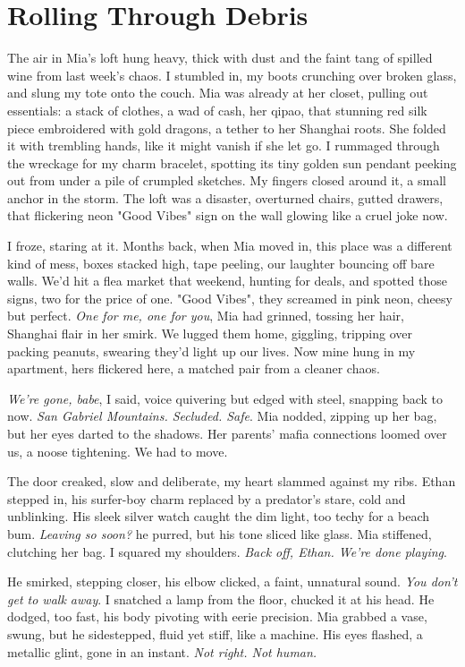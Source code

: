 \documentclass[12pt,oneside]{book}
\begin{document}
\chapter{Rolling Through Debris}

The air in Mia’s loft hung heavy, thick with dust and the faint tang of spilled wine from last week’s chaos. I stumbled in, my boots crunching over broken glass, and slung my tote onto the couch. Mia was already at her closet, pulling out essentials: a stack of clothes, a wad of cash, her qipao, that stunning red silk piece embroidered with gold dragons, a tether to her Shanghai roots. She folded it with trembling hands, like it might vanish if she let go. I rummaged through the wreckage for my charm bracelet, spotting its tiny golden sun pendant peeking out from under a pile of crumpled sketches. My fingers closed around it, a small anchor in the storm. The loft was a disaster, overturned chairs, gutted drawers, that flickering neon "Good Vibes" sign on the wall glowing like a cruel joke now.

I froze, staring at it. Months back, when Mia moved in, this place was a different kind of mess, boxes stacked high, tape peeling, our laughter bouncing off bare walls. We’d hit a flea market that weekend, hunting for deals, and spotted those signs, two for the price of one. "Good Vibes", they screamed in pink neon, cheesy but perfect. \textit{One for me, one for you}, Mia had grinned, tossing her hair, Shanghai flair in her smirk. We lugged them home, giggling, tripping over packing peanuts, swearing they’d light up our lives. Now mine hung in my apartment, hers flickered here, a matched pair from a cleaner chaos.

\textit{We’re gone, babe}, I said, voice quivering but edged with steel, snapping back to now. \textit{San Gabriel Mountains. Secluded. Safe}. Mia nodded, zipping up her bag, but her eyes darted to the shadows. Her parents’ mafia connections loomed over us, a noose tightening. We had to move.

The door creaked, slow and deliberate, my heart slammed against my ribs. Ethan stepped in, his surfer-boy charm replaced by a predator’s stare, cold and unblinking. His sleek silver watch caught the dim light, too techy for a beach bum. \textit{Leaving so soon?} he purred, but his tone sliced like glass. Mia stiffened, clutching her bag. I squared my shoulders. \textit{Back off, Ethan. We’re done playing}.

He smirked, stepping closer, his elbow clicked, a faint, unnatural sound. \textit{You don’t get to walk away}. I snatched a lamp from the floor, chucked it at his head. He dodged, too fast, his body pivoting with eerie precision. Mia grabbed a vase, swung, but he sidestepped, fluid yet stiff, like a machine. His eyes flashed, a metallic glint, gone in an instant. \textit{Not right. Not human.}
\end{document}

